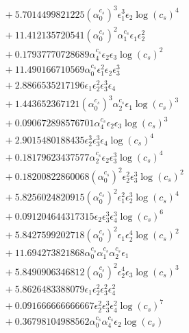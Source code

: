 \documentclass[10pt]{article}
\begin{document}
\begin{align*}
&{}  + 5.7014499821225 \left(\alpha_{0}^{c_s}\right)^{3} \epsilon_{1}^{3} \epsilon_{2} \log{\left(c_{s} \right)}^{4} \\
&{}  + 11.412135720541 \left(\alpha_{0}^{c_s}\right)^{2} \alpha_{1}^{c_s} \epsilon_{1} \epsilon_{2}^{2} \\
&{}  + 0.17937770728689 \alpha_{4}^{c_s} \epsilon_{2} \epsilon_{3} \log{\left(c_{s} \right)}^{2} \\
&{}  + 11.490166710569 \alpha_{0}^{c_s} \epsilon_{1}^{2} \epsilon_{2} \epsilon_{3}^{3} \\
&{}  + 2.8866535217196 \epsilon_{1} \epsilon_{2}^{2} \epsilon_{3}^{3} \epsilon_{4} \\
&{}  + 1.443652367121 \left(\alpha_{0}^{c_s}\right)^{3} \alpha_{2}^{c_s} \epsilon_{1} \log{\left(c_{s} \right)}^{3} \\
&{}  + 0.090672898576701 \alpha_{4}^{c_s} \epsilon_{2} \epsilon_{3} \log{\left(c_{s} \right)}^{3} \\
&{}  + 2.9015480188435 \epsilon_{2}^{3} \epsilon_{3}^{3} \epsilon_{4} \log{\left(c_{s} \right)}^{4} \\
&{}  + 0.18179623437577 \alpha_{2}^{c_s} \epsilon_{2} \epsilon_{3}^{3} \log{\left(c_{s} \right)}^{4} \\
&{}  + 0.18200822860068 \left(\alpha_{0}^{c_s}\right)^{2} \epsilon_{2}^{2} \epsilon_{3}^{3} \log{\left(c_{s} \right)}^{2} \\
&{}  + 5.8256024820915 \left(\alpha_{0}^{c_s}\right)^{2} \epsilon_{1}^{2} \epsilon_{2}^{3} \log{\left(c_{s} \right)}^{4} \\
&{}  + 0.091204644317315 \epsilon_{2} \epsilon_{3}^{3} \epsilon_{4}^{3} \log{\left(c_{s} \right)}^{6} \\
&{}  + 5.8427599202718 \left(\alpha_{0}^{c_s}\right)^{2} \epsilon_{1} \epsilon_{2}^{4} \log{\left(c_{s} \right)}^{2} \\
&{}  + 11.694273821868 \alpha_{0}^{c_s} \alpha_{1}^{c_s} \alpha_{2}^{c_s} \epsilon_{1} \\
&{}  + 5.8490906346812 \left(\alpha_{0}^{c_s}\right)^{2} \epsilon_{2}^{4} \epsilon_{3} \log{\left(c_{s} \right)}^{3} \\
&{}  + 5.8626483388079 \epsilon_{1} \epsilon_{2}^{2} \epsilon_{3}^{2} \epsilon_{4}^{2} \\
&{}  + 0.091666666666667 \epsilon_{2}^{2} \epsilon_{3}^{3} \epsilon_{4}^{2} \log{\left(c_{s} \right)}^{7} \\
&{}  + 0.36798104988562 \alpha_{0}^{c_s} \alpha_{4}^{c_s} \epsilon_{2} \log{\left(c_{s} \right)} \\

\end{align*}
\end{document}
